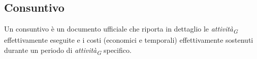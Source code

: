 \subsection{Consuntivo}
    Un consuntivo è un documento ufficiale che riporta in dettaglio le \textit{attività}\textsubscript{\textit{G}} effettivamente eseguite e i costi (economici e temporali) effettivamente sostenuti durante un periodo di \textit{attività}\textsubscript{\textit{G}} specifico.  
